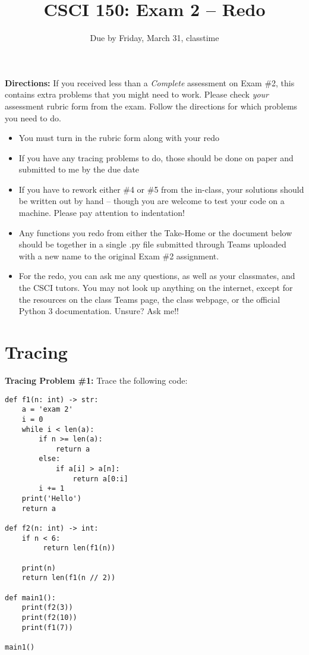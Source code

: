 \documentclass{article}
\begin{document}
\title{CSCI 150: Exam 2 -- Redo}
\author{}
\date{Due by Friday, March 31, classtime}

\maketitle

\thispagestyle{empty}

\textbf{Directions:} If you received less than a \emph{Complete} assessment on Exam \#2, this contains extra problems that you might need to work. Please check \emph{your} assessment rubric form from the exam. Follow the directions for which problems you need to do.

\begin{itemize}
  \item You must turn in the rubric form along with your redo
  \item If you have any tracing problems to do, those should be done on paper and submitted to me by the due date
  \item If you have to rework either \#4 or \#5 from the in-class, your solutions should be written out by hand -- though you are welcome to test your code on a machine. Please pay attention to indentation!
  \item Any functions you redo from either the Take-Home or the document below should be together in a single .py file submitted through Teams uploaded with a new name to the original Exam \#2 assignment.
  \item For the redo, you can ask me any questions, as well as your classmates, and the CSCI tutors. You may not look up anything on the internet, except for the resources on the class Teams page, the class webpage, or the official Python 3 documentation. Unsure? Ask me!!
\end{itemize}


  \vspace{0.3in}





\newpage

\section*{Tracing}

\textbf{Tracing Problem \#1:}  Trace the following code:

\vspace{0.15in}

\begin{verbatim}
def f1(n: int) -> str:
    a = 'exam 2'
    i = 0
    while i < len(a):
        if n >= len(a):
            return a
        else:
            if a[i] > a[n]:
                return a[0:i]
        i += 1
    print('Hello')
    return a

def f2(n: int) -> int:
    if n < 6:
         return len(f1(n))

    print(n)
    return len(f1(n // 2))

def main1():
    print(f2(3))
    print(f2(10))
    print(f1(7))

main1()
\end{verbatim}
\end{document}
